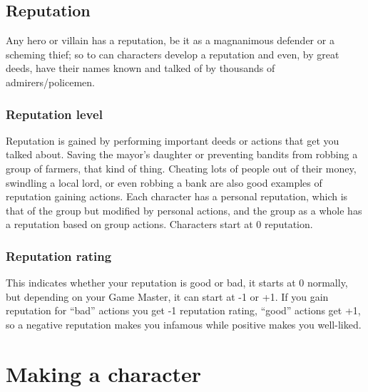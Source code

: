 \documentclass[a4paper,10pt,oneside]{book}
\begin{document}
\section{Reputation}
Any hero or villain has a reputation, be it as a magnanimous defender or a scheming thief; so to can characters develop a reputation and even, by great deeds, have their names known and talked of by thousands of admirers/policemen. 

\subsection{Reputation level}
Reputation is gained by performing important deeds or actions that get you talked about. Saving the mayor's daughter or preventing bandits from robbing a group of farmers, that kind of thing. Cheating lots of people out of their money, swindling a local lord, or even robbing a bank are also good examples of reputation gaining actions.
Each character has a personal reputation, which is that of the group but modified by personal actions, and the group as a whole has a reputation based on group actions.
Characters start at 0 reputation.

\subsection{Reputation rating}
This indicates whether your reputation is good or bad, it starts at 0 normally, but depending on your Game Master, it can start at -1 or +1. If you gain reputation for ``bad'' actions you get -1 reputation rating, ``good'' actions get +1, so a negative reputation makes you infamous while positive makes you well-liked.





\chapter{Making a character}
\end{document}
